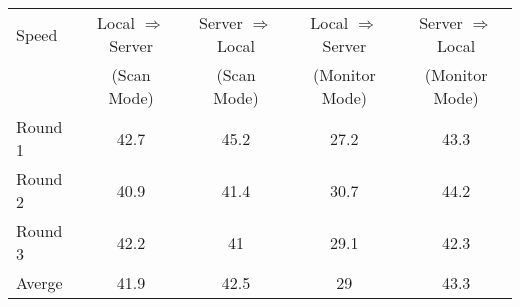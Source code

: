 \onecolumn
\begin{center}
  \begin{tabular}{ | l || c | c | c | c | }
    \hline
Speed	&	Local $\Rightarrow$ Server &	Server $\Rightarrow$ Local &	Local $\Rightarrow$ Server & Server $\Rightarrow$ Local\\
     	& (Scan Mode) &	(Scan Mode) &	(Monitor Mode)	& (Monitor Mode)\\
\hline\hline
Round 1	& 42.7 & 45.2 & 27.2 & 43.3 \\ \hline
Round 2	& 40.9 & 41.4 & 30.7 & 44.2 \\ \hline
Round 3	& 42.2 & 41	& 29.1 & 42.3	\\ \hline
Averge 	& 41.9 & 42.5 &	29 & 43.3 \\ 
	\hline
  \end{tabular}
\end{center}
\twocolumn

\twocolumn

\onecolumn